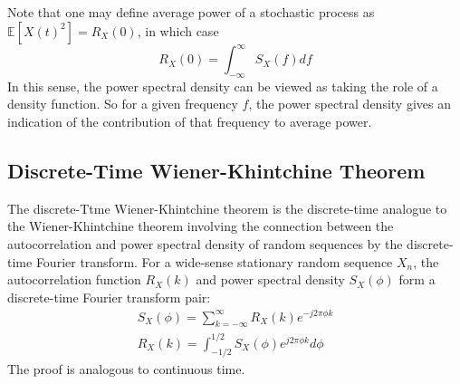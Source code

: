 \documentclass[11pt]{report} %
\begin{document}
Note that one may define average power of a stochastic process as $\mathbb{E}\left[X\left(t\right)^{2}\right] = R_{X}\left(0\right)$, in which case
\begin{equation}
R_{X}\left(0\right) = \int_{-\infty}^{\infty}S_{X}\left(f\right)df
\end{equation}
In this sense, the power spectral density can be viewed as taking the role of a density function. So for a given frequency $f$, the power spectral density gives an indication of the contribution of that frequency to average power.

\subsection{Discrete-Time Wiener-Khintchine Theorem}

The discrete-Ttme Wiener-Khintchine theorem is the discrete-time analogue to the Wiener-Khintchine theorem involving the connection between the autocorrelation and power spectral density of random sequences by the discrete-time Fourier transform. For a wide-sense stationary random sequence $X_{n}$, the autocorrelation function $R_{X}\left(k\right)$ and power spectral density $S_{X}\left(\phi\right)$ form a discrete-time Fourier transform pair:
\begin{gather}
S_{X}\left(\phi\right) = \sum_{k = -\infty}^{\infty}R_{X}\left(k\right)e^{-j2\pi\phi k} \\
R_{X}\left(k\right) = \int_{-1/2}^{1/2}S_{X}\left(\phi\right)e^{j2\pi\phi k}d\phi
\end{gather}
The proof is analogous to continuous time.
\end{document}
